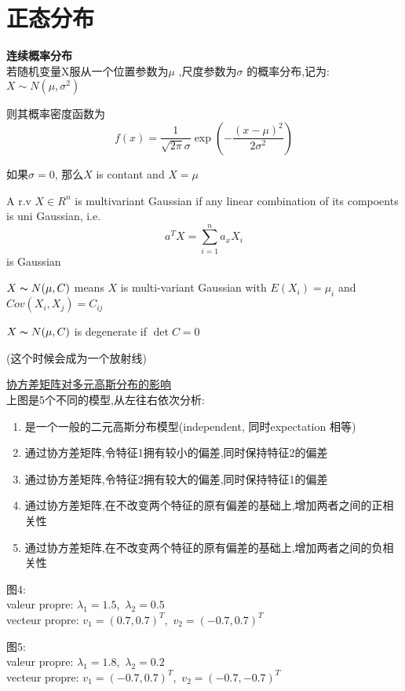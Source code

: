 \documentclass{article}
\begin{document}
\section{正态分布}
\textbf{连续概率分布}\\
若随机变量X服从一个位置参数为$\mu$ ,尺度参数为$\sigma$ 的概率分布,记为:$X\sim N(\mu ,\sigma ^{2})$

则其概率密度函数为
$$f(x)=\frac{1}{\sqrt{2\pi} \sigma} \exp({- \dfrac{(x-\mu )^{2}}{2\sigma ^{2}}})$$

如果$\sigma = 0$, 那么$X$ is contant and $X = \mu$

\begin{definition}
A r.v $X \in R^n$ is multivariant Gaussian if any linear combination of its compoents is uni Gaussian, i.e.
$$a^T X = \sum_{i=1}^n a_x X_i$$ is Gaussian
\end{definition}

$X \thicksim{N}(\mu, C)$ means $X$ is multi-variant Gaussian with $E(X_i) = \mu_i$ and $Cov(X_i, X_j) = C_{ij}$

\begin{definition}
$X \thicksim{N}(\mu, C)$ is degenerate if $\det{C} = 0$
\end{definition}
(这个时候会成为一个放射线)

\href{http://www.ryanzhang.info/wp-content/uploads/2013/07/QQ\%E6\%88\%AA\%E5\%9B\%BE20130706200349.png}{协方差矩阵对多元高斯分布的影响}\\
上图是5个不同的模型,从左往右依次分析:
\begin{enumerate}
\item 是一个一般的二元高斯分布模型(independent, 同时expectation 相等)
\item 通过协方差矩阵,令特征1拥有较小的偏差,同时保持特征2的偏差
\item 通过协方差矩阵,令特征2拥有较大的偏差,同时保持特征1的偏差
\item 通过协方差矩阵,在不改变两个特征的原有偏差的基础上,增加两者之间的正相关性
\item 通过协方差矩阵,在不改变两个特征的原有偏差的基础上,增加两者之间的负相关性
\end{enumerate}

图4:\\
valeur propre:
$\lambda_1 = 1.5$,\
$\lambda_2 = 0.5$\\
vecteur propre:
$v_1 = (0.7, 0.7)^T$,\
$v_2 = (-0.7, 0.7)^T$

图5:\\
valeur propre:
$\lambda_1 = 1.8$,\
$\lambda_2 = 0.2$\\
vecteur propre:
$v_1 = (-0.7, 0.7)^T$,\
$v_2 = (-0.7, -0.7)^T$
\end{document}
